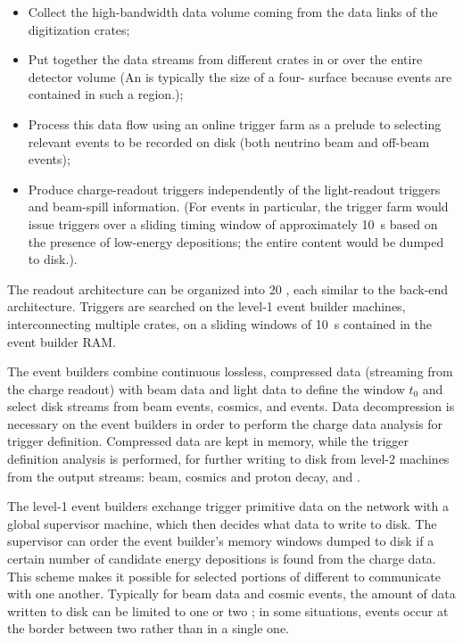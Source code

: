 \begin{itemize}
\item Collect the high-bandwidth data volume coming from the data links of the  digitization crates; 
\item Put together the data streams from different crates in  or over the entire detector volume (An  is typically the size of a  four- surface because events are contained in such a region.);
\item Process this data flow using an online trigger farm  as a prelude to selecting relevant events to be recorded on disk (both neutrino beam and off-beam events);
\item Produce charge-readout triggers independently of the light-readout triggers and beam-spill information. 
(For  events in particular, the trigger farm would issue triggers over a sliding timing window of approximately \SI{10}{s}  based on the presence of low-energy depositions; the entire content would be dumped to disk.).
\end{itemize}

The  readout architecture can be organized into \num{20} , each similar to the  back-end architecture. Triggers are searched on the level-1 event builder machines, interconnecting multiple  crates, on a sliding windows of \SI{10}{s}  contained in the event builder RAM.

The event builders combine continuous lossless, compressed data (streaming from the charge readout) with beam data and light data to define the window $t_0$ and select disk streams from beam events, cosmics, and  events. Data decompression is necessary on the event builders in order to perform the charge data analysis for trigger definition. Compressed data are kept in memory, while the trigger definition analysis is performed, for further writing to disk from level-2 machines from the output streams: beam, cosmics and proton decay, and . 

The level-1 event builders exchange trigger primitive data on the network with a global supervisor machine, which then decides what data to write to disk.  The supervisor can order the event builder's memory  windows dumped to disk if a certain number of candidate energy depositions is found from the charge data.  This scheme makes it possible for selected portions of different  to communicate with one another.  
Typically for beam data and cosmic events, the amount of data written to disk can be limited to one or two ; in some situations, events occur at the border between two  rather than in a single one.


